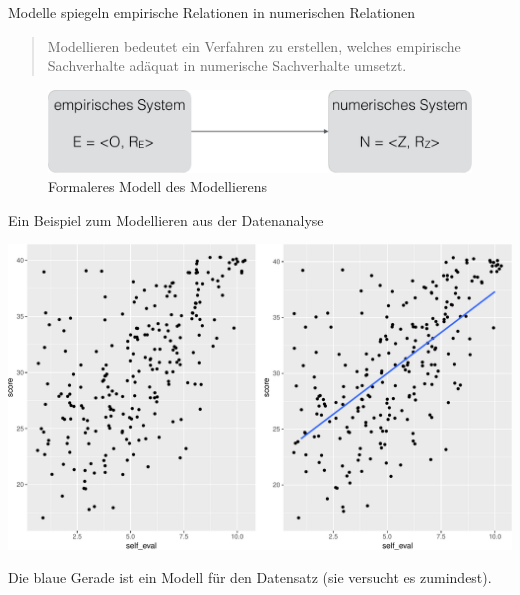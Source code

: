 \begin{frame}{Modelle spiegeln empirische Relationen in numerischen
Relationen}

\begin{quote}
Modellieren bedeutet ein Verfahren zu erstellen, welches empirische
Sachverhalte adäquat in numerische Sachverhalte umsetzt.
\end{quote}

\begin{figure}

{\centering \includegraphics[width=0.8\linewidth]{../images/modellieren/Modellieren_formal_crop} 

}

\caption{Formaleres Modell des Modellierens}\label{fig:modellieren-formal}
\end{figure}

\end{frame}

\begin{frame}{Ein Beispiel zum Modellieren aus der Datenanalyse}

\begin{center}\includegraphics[width=0.8\linewidth]{PraDa_Folien_nm_2_files/figure-beamer/plot-stats-smooth-1} \end{center}

Die blaue Gerade ist ein Modell für den Datensatz (sie versucht es
zumindest).

\end{frame}

